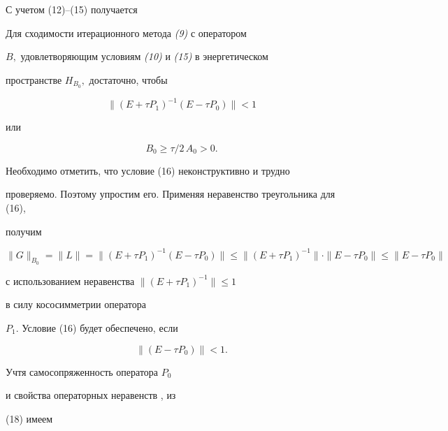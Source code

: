  


С учетом (12)--(15) получается 


 


\begin{thm} Для сходимости итерационного метода {\em (9)} с оператором  


$B,$ удовлетворяющим условиям {\em (10)} и {\em (15)} в энергетическом 


пространстве $H_{B_0},$ достаточно, чтобы 


\begin{equation} 


\|(E+\tau P_1)^{-1}(E-\tau P_0)\| <1 


\end{equation} 


или 


\begin{equation} 


B_0 \ge \tau /2\,A_0>0. 


\end{equation} 


\end{thm} 


 


Необходимо отметить, что условие (16) неконструктивно и трудно 


проверяемо. Поэтому упростим его. Применяя неравенство треугольника для (16), 


получим 


$$ 


\|G\|_{B_0}=\|L\|=\|(E+\tau P_1)^{-1}(E-\tau P_0)\| \le 


\|(E+\tau P_1)^{-1}\|\cdot \|E-\tau P_0\| \le \|E-\tau P_0\| 


$$ 


с использованием неравенства $\|(E+\tau P_1)^{-1}\|\le 1$ 


в силу кососимметрии оператора 


$P_1$. Условие (16) будет обеспечено, если 


\begin{equation} 


\|(E-\tau P_0)\| < 1. 


\end{equation} 


Учтя самосопряженность оператора $P_0$ 


и свойства операторных неравенств \cite{Gul}, из 


(18) имеем 



